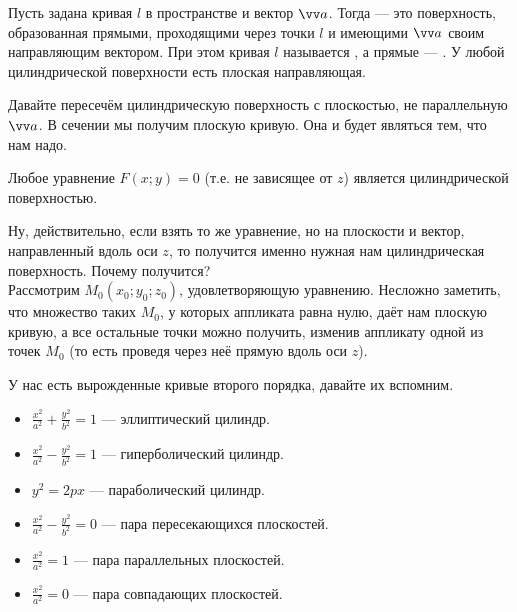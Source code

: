 \documentclass{article}
\let\vec\vv
\begin{document}
    \begin{itemize}
        \dfn Пусть задана кривая $l$ в пространстве и вектор $\vec a$. Тогда  --- это поверхность, образованная прямыми, проходящими через точки $l$ и имеющими $\vec a$ своим направляющим вектором. При этом кривая $l$ называется , а прямые --- .
        \thm У любой цилиндрической поверхности есть плоская направляющая.
        \begin{Proof}
            Давайте пересечём цилиндрическую поверхность с плоскостью, не параллельную $\vec a$. В сечении мы получим плоскую кривую. Она и будет являться тем, что нам надо.
        \end{Proof}
        \thm Любое уравнение $F(x;y)=0$ (т.е. не зависящее от $z$) является цилиндрической поверхностью.
        \begin{Proof}
            Ну, действительно, если взять то же уравнение, но на плоскости и вектор, направленный вдоль оси $z$, то получится именно нужная нам цилиндрическая поверхность. Почему получится?\\
            Рассмотрим $M_0(x_0;y_0;z_0)$, удовлетворяющую уравнению. Несложно заметить, что множество таких $M_0$, у которых аппликата равна нулю, даёт нам плоскую кривую, а все остальные точки можно получить, изменив аппликату одной из точек $M_0$ (то есть проведя через неё прямую вдоль оси $z$).
        \end{Proof}
        \begin{Example}
            У нас есть вырожденные кривые второго порядка, давайте их вспомним.
            \begin{itemize}
                \item $\frac{x^2}{a^2}+\frac{y^2}{b^2}=1$ --- эллиптический цилиндр.
                \item $\frac{x^2}{a^2}-\frac{y^2}{b^2}=1$ --- гиперболический цилиндр.
                \item $y^2=2px$ --- параболический цилиндр.
                \item $\frac{x^2}{a^2}-\frac{y^2}{b^2}=0$ --- пара пересекающихся плоскостей.
                \item $\frac{x^2}{a^2}=1$ --- пара параллельных плоскостей.
                \item $\frac{x^2}{a^2}=0$ --- пара совпадающих плоскостей.
            \end{itemize}
        \end{Example}
    \end{itemize}
\end{document}
